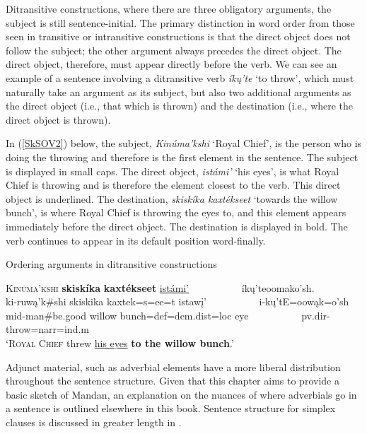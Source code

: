 Ditransitive constructions, where there are three obligatory arguments, the subject is still sentence-initial. The primary distinction in word order from those seen in transitive or intransitive constructions is that the direct object does not follow the subject; the other argument always precedes the direct object. The direct object, therefore, must appear directly before the verb. We can see an example of a sentence involving a ditransitive verb \textit{íkų'te} `to throw', which must naturally take an argument as its subject, but also two additional arguments as the direct object (i.e., that which is thrown) and the destination (i.e., where the direct object is thrown).

\largerpage
In (\ref{SkSOV2}) below, the subject, \textit{Kinúma'kshi} `Royal Chief', is the person who is doing the throwing and therefore is the first element in the sentence. The subject is displayed in small caps. The direct object, \textit{istámi'} `his eyes', is what Royal Chief is throwing and is therefore the element closest to the verb. This direct object is underlined. The destination, \textit{skiskíka kaxtékseet} `towards the willow bunch', is where Royal Chief is throwing the eyes to, and this element appears immediately before the direct object. The destination is displayed in bold. The verb continues to appear in its default position word-finally.

\begin{exe}
    \item\label{SkSOV2} Ordering arguments in ditransitive constructions

    \glll \textsc{Kinúma'kshi} \textbf{skiskíka} \textbf{kaxtékseet} \uline{istámi'} ~ ~ ~ ~ ~ ~ íkų'teoomako'sh.\\
    ki-ruwą'k\#shi skiskika kaxtek=s=ee=t istawį' ~ ~ ~ ~ ~ ~ i-kų'tE=oowąk=o'sh\\
    mid-\textnormal{man}\#\textnormal{be.good} \textnormal{willow} \textnormal{bunch}=def=dem.dist=loc \textnormal{eye} ~ ~ ~ ~ ~ ~ pv.dir-\textnormal{throw}=narr=ind.m\\
    \glt `\textsc{Royal Chief} threw \uline{his eyes} \textbf{to the willow bunch}.' \citep[34]{hollow1973a}
\end{exe}

Adjunct material, such as adverbial elements have a more liberal distribution throughout the sentence structure. Given that this chapter aims to provide a basic sketch of Mandan, an explanation on the nuances of where adverbials go in a sentence is outlined elsewhere in this book. Sentence structure for simplex clauses is discussed in greater length in .

